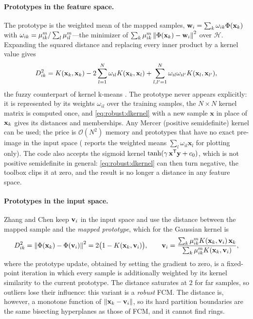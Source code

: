 \paragraph{Prototypes in the feature space.} The prototype is the weighted mean of the mapped samples, $\mathbf{w}_i=\sum_k \omega_{ik}\Phi(\mathbf{x}_k)$ with $\omega_{ik}=\mu_{ik}^m/\sum_l\mu_{il}^m$---the minimizer of $\sum_k\mu_{ik}^m\left\lVert \Phi(\mathbf{x}_k)-\mathbf{w}_i \right\rVert^2$ over $\mathcal{H}$. Expanding the squared distance and replacing every inner product by a kernel value gives
\begin{equation}
  D^2_{ik}=K(\mathbf{x}_k,\mathbf{x}_k)-2\sum_{l=1}^{N}\omega_{il}K(\mathbf{x}_k,\mathbf{x}_l)+\sum_{l,l'=1}^{N}\omega_{il}\omega_{il'}K(\mathbf{x}_l,\mathbf{x}_{l'}),
  \label{eq:robust:dkernel}
\end{equation}
the fuzzy counterpart of kernel k-means \cite{girolami:2002:kernel}. The prototype never appears explicitly: it is represented by its weights $\omega_{il}$ over the training samples, the $N\times N$ kernel matrix is computed once, and \eqref{eq:robust:dkernel} with a new sample $\mathbf{x}$ in place of $\mathbf{x}_k$ gives its distances and memberships. Any Mercer (positive semidefinite) kernel can be used; the price is $\mathcal{O}(N^2)$ memory and prototypes that have no exact pre-image in the input space ( reports the weighted means $\sum_l \omega_{il}\mathbf{x}_l$ for plotting only). The code also accepts the sigmoid kernel $\tanh(\gamma\,\mathbf{x}^{\mathsf{T}}\mathbf{y}+c_0)$, which is not positive semidefinite in general: \eqref{eq:robust:dkernel} can then turn negative, the toolbox clips it at zero, and the result is no longer a distance in any feature space.

\paragraph{Prototypes in the input space.} Zhang and Chen \cite{zhang:2004:kfcm} keep $\mathbf{v}_i$ in the input space and use the distance between the mapped sample and the \emph{mapped prototype}, which for the Gaussian kernel is
\begin{equation}
  D^2_{ik}=\left\lVert \Phi(\mathbf{x}_k)-\Phi(\mathbf{v}_i) \right\rVert^2=2\big(1-K(\mathbf{x}_k,\mathbf{v}_i)\big),\qquad
  \mathbf{v}_i=\frac{\sum_k\mu_{ik}^m K(\mathbf{x}_k,\mathbf{v}_i)\,\mathbf{x}_k}{\sum_k\mu_{ik}^m K(\mathbf{x}_k,\mathbf{v}_i)},
  \label{eq:robust:kfcmf}
\end{equation}
where the prototype update, obtained by setting the gradient to zero, is a fixed-point iteration in which every sample is additionally weighted by its kernel similarity to the current prototype. The distance saturates at $2$ for far samples, so outliers lose their influence: this variant is a \emph{robust} FCM. The distance is, however, a monotone function of $\left\lVert \mathbf{x}_k-\mathbf{v}_i \right\rVert$, so its hard partition boundaries are the same bisecting hyperplanes as those of FCM, and it cannot find rings.

